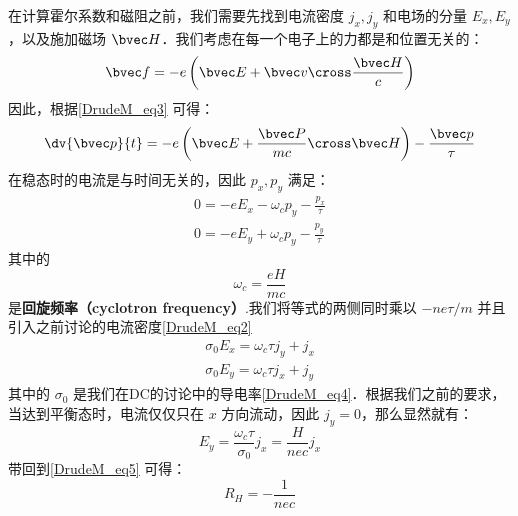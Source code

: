 在计算霍尔系数和磁阻之前，我们需要先找到电流密度 $j_x,j_y$ 和电场的分量 $E_x,E_y$，以及施加磁场 $\bvec H$．我们考虑在每一个电子上的力都是和位置无关的：
\begin{equation}
\bvec f = -e\left(\bvec E +\bvec v\cross \frac{\bvec H}{c}\right)
\end{equation}
因此，根据\autoref{DrudeM_eq3} 可得：
\begin{equation}
\dv{\bvec p}{t}=-e\left(\bvec E +\frac{\bvec P}{mc}\cross \bvec H\right)-\frac{\bvec p}{\tau}
\end{equation}
在稳态时的电流是与时间无关的，因此 $p_x,p_y$ 满足：
\begin{align}
0=-eE_x-\omega_c p_y -\frac{p_x}{\tau}\\
0=-eE_y+\omega_c p_y -\frac{p_y}{\tau}
\end{align}
其中的
\begin{equation}
\omega_c = \frac{eH}{mc}
\end{equation}
是\textbf{回旋频率（cyclotron frequency）}.我们将等式的两侧同时乘以 $-ne\tau/m$ 并且引入之前讨论的电流密度\autoref{DrudeM_eq2} 
\begin{align}
\sigma_0 E_x = \omega_c \tau j_y+j_x\\
\sigma_0 E_y = \omega_c \tau j_x+j_y
\end{align}
其中的 $\sigma_0$ 是我们在DC的讨论中的导电率\autoref{DrudeM_eq4}．根据我们之前的要求，当达到平衡态时，电流仅仅只在 $x$ 方向流动，因此 $j_y = 0$，那么显然就有：
\begin{equation}
 E_y = \frac{\omega_c \tau }{\sigma_0}j_x=\frac{H}{nec}j_x
\end{equation}
带回到\autoref{DrudeM_eq5} 可得：
\begin{equation}
R_H=-\frac{1}{nec}
\end{equation}

